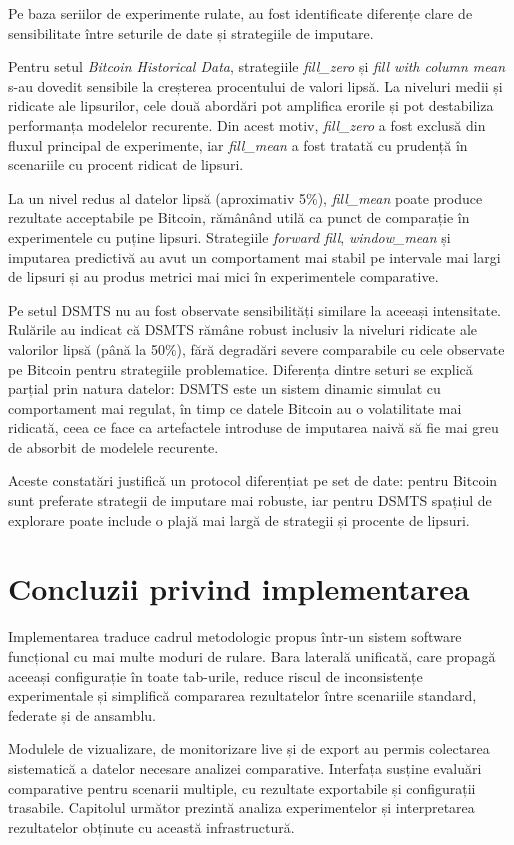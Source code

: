 Pe baza seriilor de experimente rulate, au fost identificate diferențe clare de sensibilitate între seturile de date și strategiile de imputare.

Pentru setul \textit{Bitcoin Historical Data}, strategiile \textit{fill\_zero} și \textit{fill with column mean} s-au dovedit sensibile la creșterea procentului de valori lipsă. La niveluri medii și ridicate ale lipsurilor, cele două abordări pot amplifica erorile și pot destabiliza performanța modelelor recurente. Din acest motiv, \textit{fill\_zero} a fost exclusă din fluxul principal de experimente, iar \textit{fill\_mean} a fost tratată cu prudență în scenariile cu procent ridicat de lipsuri.

La un nivel redus al datelor lipsă (aproximativ 5\%), \textit{fill\_mean} poate produce rezultate acceptabile pe Bitcoin, rămânând utilă ca punct de comparație în experimentele cu puține lipsuri. Strategiile \textit{forward fill}, \textit{window\_mean} și imputarea predictivă au avut un comportament mai stabil pe intervale mai largi de lipsuri și au produs metrici mai mici în experimentele comparative.

Pe setul DSMTS nu au fost observate sensibilități similare la aceeași intensitate. Rulările au indicat că DSMTS rămâne robust inclusiv la niveluri ridicate ale valorilor lipsă (până la 50\%), fără degradări severe comparabile cu cele observate pe Bitcoin pentru strategiile problematice. Diferența dintre seturi se explică parțial prin natura datelor: DSMTS este un sistem dinamic simulat cu comportament mai regulat, în timp ce datele Bitcoin au o volatilitate mai ridicată, ceea ce face ca artefactele introduse de imputarea naivă să fie mai greu de absorbit de modelele recurente.

Aceste constatări justifică un protocol diferențiat pe set de date: pentru Bitcoin sunt preferate strategii de imputare mai robuste, iar pentru DSMTS spațiul de explorare poate include o plajă mai largă de strategii și procente de lipsuri.

\section{Concluzii privind implementarea}

Implementarea traduce cadrul metodologic propus într-un sistem software funcțional cu mai multe moduri de rulare. Bara laterală unificată, care propagă aceeași configurație în toate tab-urile, reduce riscul de inconsistențe experimentale și simplifică compararea rezultatelor între scenariile standard, federate și de ansamblu.

Modulele de vizualizare, de monitorizare live și de export au permis colectarea sistematică a datelor necesare analizei comparative. Interfața susține evaluări comparative pentru scenarii multiple, cu rezultate exportabile și configurații trasabile. Capitolul următor prezintă analiza experimentelor și interpretarea rezultatelor obținute cu această infrastructură.
